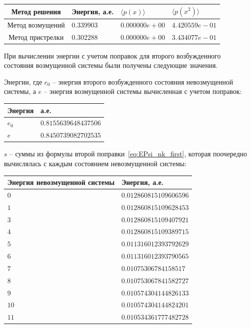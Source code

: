 \noindent
\begin{tabularx}{\linewidth}{|c|X|X|X|}
    \hline
    \textbf{Метод решения}&\textbf{Энергия, а.е.}&\textbf{$\langle p(x) \rangle$}&\textbf{$\langle p(x^2) \rangle$} \\
    \hline
    Метод возмущений & $0.339903$ & $0.000000e+00$ & $4.420559e-01$\\
    \hline
    Метод пристрелки & $0.302288$ & $0.000000e+00$ & $3.434077e-01$\\
    \hline
\end{tabularx}


При вычислении энергии с учетом поправок для второго возбужденного состояния возмущенной системы были получены следующие значения.


Энергии, где $e_0$ -- энергия второго возбужденного состояния невозмущенной системы, а $e$ -- энергия возмущенной системы вычисленная с учетом поправок:

\begin{table}[H]
    \centering
    \begin{tabularx}{0.6\linewidth}{|X|X|}
        \hline
        \textbf{Энергия}&\textbf{а.е.} \\
        \hline
        $e_0$ & $0.8155639648437506$ \\
        \hline
        $e$ & $0.8450739082702535$ \\
        \hline
    \end{tabularx}
    \label{tab:sums2}
\end{table}

$s$ -- суммы из формулы второй поправки~\eqref{eq:EPsi_nk_first}, которая поочередно вычислялась с каждым состоянием невозмущенной системы:

\begin{table}[H]
    \centering
    \begin{tabularx}{0.8\linewidth}{|X|X|}
        \hline
        \textbf{Энергия невозмущенной системы}&\textbf{Энергия, а.е.} \\
        \hline
        $0$& $0.012860815109606596$ \\
        \hline
        $1$& $0.012860815109628453$ \\
        \hline
        $3$& $0.012860815109407921$ \\
        \hline
        $4$& $0.012860815109389715$ \\
        \hline
        $5$& $0.011316012393792629$ \\
        \hline
        $6$& $0.011316012393790565$ \\
        \hline
        $7$& $0.01075306784158517$ \\
        \hline
        $8$& $0.010753067841582727$ \\
        \hline
        $9$& $0.010574304144826133$ \\
        \hline
        $10$ & $0.010574304144824201$ \\
        \hline
        $11$ & $0.010534361777482728$ \\
        \hline
    \end{tabularx}
    \label{tab:energies_212}
\end{table}


